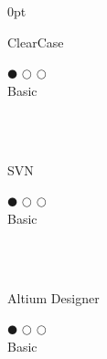 \documentclass[a4paper]{article}
\begin{document}
\begin{adjustwidth}{\parindent}{0pt}
\begin{minipage}[t]{0.25\textwidth}
 \begin{minipage}{0.65\textwidth}
   \small{ClearCase}
 \end{minipage}
 \begin{minipage}{0.3\textwidth}
   \centering $\mdlgblkcircle$ $\mdlgwhtcircle$ $\mdlgwhtcircle$ \\  \footnotesize{Basic}
 \end{minipage} \\ \hspace{0pt} \\

 \begin{minipage}{0.65\textwidth}
  \small{SVN}
 \end{minipage}
 \begin{minipage}{0.3\textwidth}
  \centering $\mdlgblkcircle$ $\mdlgwhtcircle$ $\mdlgwhtcircle$ \\  \footnotesize{Basic}
 \end{minipage} \\ \hspace{0pt} \\
 
  \begin{minipage}{0.65\textwidth}
   \small{Altium Designer}
 \end{minipage}
 \begin{minipage}{0.3\textwidth}
   \centering $\mdlgblkcircle$ $\mdlgwhtcircle$ $\mdlgwhtcircle$ \\  \footnotesize{Basic}
 \end{minipage} \\ \hspace{0pt} \\

\end{minipage}
\end{adjustwidth}
\end{document}
